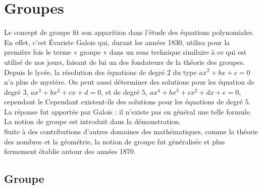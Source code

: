 \documentclass{book}
\begin{document}
\chapter*{Groupes}



\begin{Texte}%
Le concept de groupe fit son apparition dans l'étude des équations polynomiales. En effet, c'est Évariste Galois qui, durant les années 1830, utilisa pour la première fois le terme « groupe » dans un sens technique similaire à ce qui est utilisé de nos jours, faisant de lui un des fondateurs de la théorie des groupes. \\
Depuis le lycée, la résolution des équations de degré $2$ du type
$ax^2+bx+c=0$ n'a plus de mystère. On peut aussi déterminer des solutions pour les équation de degré $3$, $ax^3+bx^2+cx+d=0$, et de degré $5$, $ax^4+bx^3+cx^2+dx+e=0$, cependant le 
Cependant existent-ils des solutions pour les équations de degré  $5$. La réponse fut apportée par Galois : il n'existe pas en général une telle
 formule. La notion de groupe est introduit dans la démonstration. \\
Suite à des contributions d'autres domaines des mathématiques, comme la théorie des nombres et la géométrie, la notion de groupe fut généralisée et plus fermement établie autour des années 1870.\\
\end{Texte}
\section{Groupe}
\end{document}

